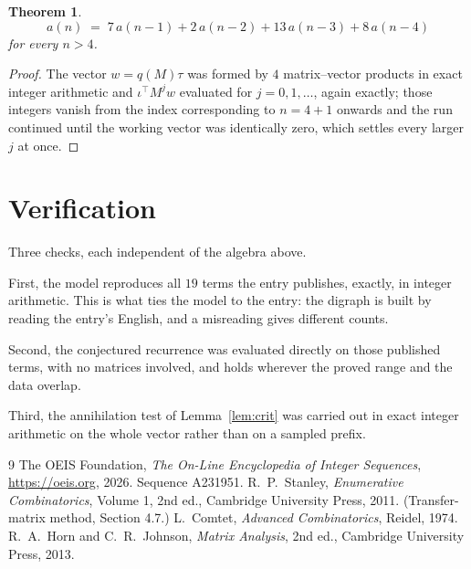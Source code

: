 \documentclass[11pt,a4paper]{article}
\theoremstyle{plain}
\newtheorem{theorem}{Theorem}
\theoremstyle{definition}
\begin{document}
\begin{theorem}
\[
a(n)\;=\;7\,a(n-1) + 2\,a(n-2) + 13\,a(n-3) + 8\,a(n-4)
\]
for every $n>4$.
\end{theorem}

\begin{proof}
The vector $w=q(M)\tau$ was formed by $4$ matrix--vector products in exact integer
arithmetic and $\iota^{\!\top}M^{j}w$ evaluated for $j=0,1,\dots$, again exactly; those
integers vanish from the index corresponding to $n=4+1$ onwards and the run continued
until the working vector was identically zero, which settles every larger $j$ at once.
\end{proof}

\section{Verification}

Three checks, each independent of the algebra above.

First, the model reproduces all $19$ terms the entry publishes, exactly, in integer
arithmetic. This is what ties the model to the entry: the digraph is built by reading the
entry's English, and a misreading gives different counts.

Second, the conjectured recurrence was evaluated directly on those published terms, with no
matrices involved, and holds wherever the proved range and the data overlap.

Third, the annihilation test of Lemma~\ref{lem:crit} was carried out in exact integer
arithmetic on the whole vector rather than on a sampled prefix.

\begin{thebibliography}{9}
 The OEIS Foundation, \emph{The On-Line Encyclopedia of Integer
Sequences}, \url{https://oeis.org}, 2026. Sequence A231951.
 R.~P.~Stanley, \emph{Enumerative Combinatorics}, Volume 1, 2nd ed.,
Cambridge University Press, 2011. (Transfer-matrix method, Section 4.7.)
 L.~Comtet, \emph{Advanced Combinatorics}, Reidel, 1974.
 R.~A.~Horn and C.~R.~Johnson, \emph{Matrix Analysis}, 2nd ed., Cambridge
University Press, 2013.
\end{thebibliography}
\end{document}

